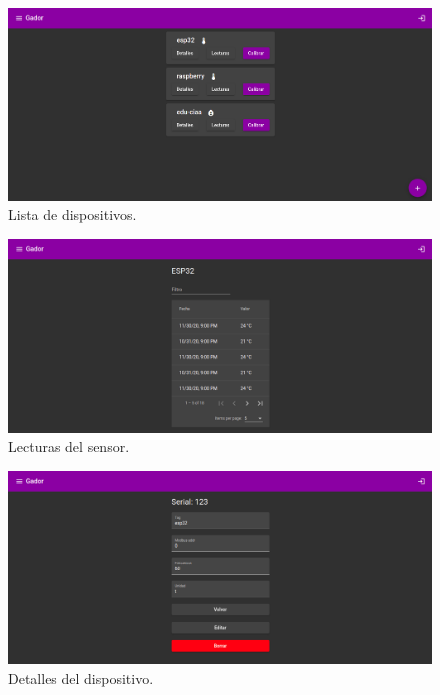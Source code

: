 \begin{figure}[h]
	\centering
	\includegraphics[width=\textwidth]{./Figures/Dispositivos.png}
	\caption{Lista de dispositivos.}
	\label{fig:ch3FrontendImg1}
\end{figure}

\begin{figure}[h]
	\centering
	\includegraphics[width=\textwidth]{./Figures/Readings.png}
	\caption{Lecturas del sensor.}
	\label{fig:ch3FrontendImg2}
\end{figure}

\begin{figure}[h]
	\centering
	\includegraphics[width=\textwidth]{./Figures/DeviceDetails.png}
	\caption{Detalles del dispositivo.}
	\label{fig:ch3FrontendImg3}
\end{figure}